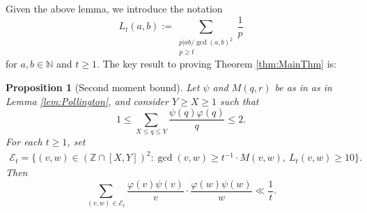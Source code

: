 \documentclass[12pt]{amsart}
\numberwithin{equation}{section}
\newtheorem{prop}[lem]{Proposition}
\theoremstyle{definition}
\theoremstyle{remark}
\newcommand{\N}{\mathbb{N}}
\newcommand{\Z}{\mathbb{Z}}
\newcommand{\CE}{\mathcal{E}}
\newcommand{\eq}[1]{ \begin{equation} \begin{split} #1 \end{split} \end{equation} }
\renewcommand{\phi}{\varphi}
\renewcommand{\le}{\leqslant}
\renewcommand{\ge}{\geqslant}
\begin{document}
Given the above lemma, we introduce the notation
\begin{equation}\label{eq:L_t-dfn}
L_t(a,b):= 
\sum_{\substack{p|ab/\gcd(a,b)^2 \\ p\ge t}} \frac{1}{p}
\end{equation}
for $a,b\in\N$ and $t\ge1$. The key result to proving Theorem \ref{thm:MainThm} is:

\begin{prop}[Second moment bound]\label{prop:GCD}
Let $\psi$ and $M(q,r)$ be as in as in Lemma \ref{lem:Pollington}, and consider $Y\ge X\ge1$ such that
\[
1\le \sum_{X\le q\le Y} \frac{\psi(q)\phi(q)}{q} \le2 .
\]
For each $t\ge1$, set
\eq{\label{eq:E_t}
\CE_t 
	= \big\{(v,w)\in (\Z\cap[X,Y])^2 :  \gcd(v,w)\ge  t^{-1}\cdot M(v,w) ,\ L_t(v,w)  \ge 10 \big\}.
}
Then 
\[
\sum_{(v,w)\in \CE_t}  \frac{\phi(v)\psi(v)}{v}\cdot \frac{\phi(w)\psi(w)}{w} \ll \frac{1}{t} .
\]
\end{prop}
\end{document}
